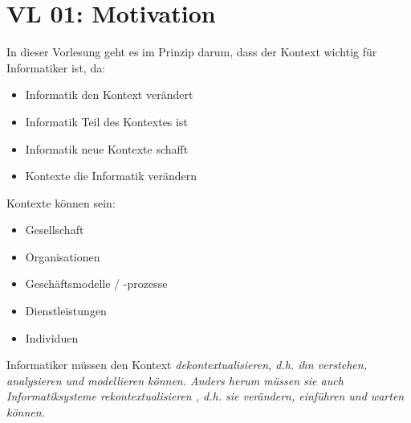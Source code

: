 \section{VL 01: Motivation}
In dieser Vorlesung geht es im Prinzip darum, dass der Kontext wichtig für Informatiker ist, da:
\begin{itemize}
	\item Informatik den Kontext verändert
	\item Informatik Teil des Kontextes ist
	\item Informatik neue Kontexte schafft
	\item Kontexte die Informatik verändern
\end{itemize}
Kontexte können sein:
\begin{itemize}
	\item Gesellschaft
	\item Organisationen
	\item Geschäftsmodelle / -prozesse
	\item Dienstleistungen
	\item Individuen
\end{itemize}

Informatiker müssen den Kontext \em dekontextualisieren\em, d.h. ihn \em verstehen, analysieren und modellieren \em können. Anders herum müssen sie auch Informatiksysteme \em rekontextualisieren \em, d.h. sie \em verändern, einführen und warten \em können.